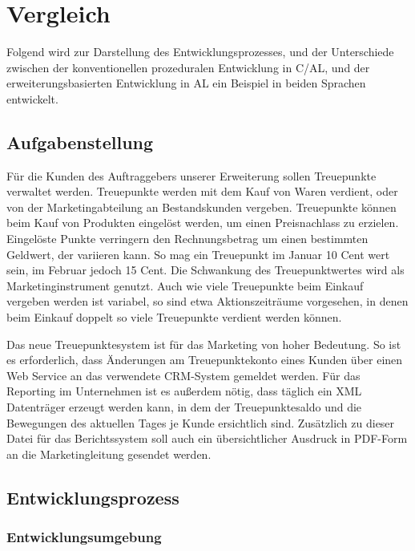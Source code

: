 \chapter{Vergleich}
\label{cha:Vergleich}

Folgend wird zur Darstellung des Entwicklungsprozesses, und der Unterschiede zwischen der konventionellen prozeduralen Entwicklung in C/AL, und der erweiterungsbasierten Entwicklung in AL ein Beispiel in beiden Sprachen entwickelt.


\section{Aufgabenstellung}
\label{sec:Aufgabenstellung}

Für die Kunden des Auftraggebers unserer Erweiterung sollen Treuepunkte verwaltet werden. Treuepunkte werden mit dem Kauf von Waren verdient, oder von der Marketingabteilung an Bestandskunden vergeben. Treuepunkte können beim Kauf von Produkten eingelöst werden, um einen Preisnachlass zu erzielen. Eingelöste Punkte verringern den Rechnungsbetrag um einen bestimmten Geldwert, der variieren kann. So mag ein Treuepunkt im Januar 10 Cent wert sein, im Februar jedoch 15 Cent. Die Schwankung des Treuepunktwertes wird als Marketinginstrument genutzt. Auch wie viele Treuepunkte beim Einkauf vergeben werden ist variabel, so sind etwa Aktionszeiträume vorgesehen, in denen beim Einkauf doppelt so viele Treuepunkte verdient werden können.
\linebreak

Das neue Treuepunktesystem ist für das Marketing von hoher Bedeutung. So ist es erforderlich, dass Änderungen am Treuepunktekonto eines Kunden über einen Web Service an das verwendete CRM-System gemeldet werden. Für das Reporting im Unternehmen ist es außerdem nötig, dass täglich ein XML Datenträger erzeugt werden kann, in dem der Treuepunktesaldo und die Bewegungen des aktuellen Tages je Kunde ersichtlich sind. Zusätzlich zu dieser Datei für das Berichtssystem soll auch ein übersichtlicher Ausdruck in PDF-Form an die Marketingleitung gesendet werden.
\pagebreak

\section{Entwicklungsprozess}
\label{sec:Entwicklungsprozess}

\subsection{Entwicklungsumgebung}
